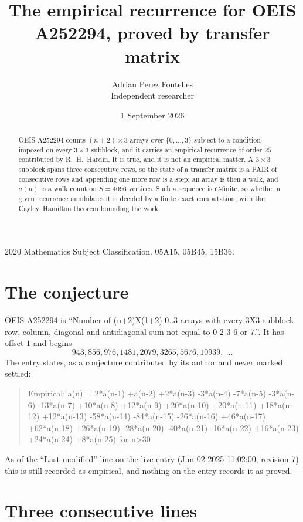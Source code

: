 \documentclass[11pt,a4paper]{article}
\title{The empirical recurrence for OEIS A252294, proved by transfer matrix}
\author{Adrian Perez Fontelles\\ \small Independent researcher}
\date{1 September 2026}
\theoremstyle{plain}
\theoremstyle{definition}
\begin{document}
\maketitle

\begin{abstract}
OEIS A252294 counts $(n+2)\times3$ arrays over $\{0,\dots,3\}$ subject to a condition imposed on
every $3\times3$ subblock, and it carries an empirical recurrence of order $25$
contributed by R.~H.~Hardin. It is true, and it is not an empirical matter. A $3\times3$
subblock spans three consecutive rows, so the state of a transfer matrix is a PAIR of
consecutive rows and appending one more row is a step; an array is then a walk, and
$a(n)$ is a walk count on $S=4096$ vertices. Such a sequence is $C$-finite, so whether a given
recurrence annihilates it is decided by a finite exact computation, with the Cayley--Hamilton
theorem bounding the work.
\end{abstract}

\noindent\small 2020 Mathematics Subject Classification. 05A15, 05B45, 15B36.\normalsize

\section{The conjecture}

OEIS A252294 is ``Number of (n+2)X(1+2) 0..3 arrays with every 3X3 subblock row, column, diagonal and antidiagonal sum not equal to 0 2 3 6 or 7.''. It has offset $1$ and begins
\[
943, 856, 976, 1481, 2079, 3265, 5676, 10939,\ \dots
\]
The entry states, as a conjecture contributed by its author and never marked settled:
\begin{quote}
Empirical: a(n) = 2*a(n-1) +a(n-2) +2*a(n-3) -3*a(n-4) -7*a(n-5) -3*a(n-6) -13*a(n-7) +10*a(n-8) +12*a(n-9) +20*a(n-10) +20*a(n-11) +18*a(n-12) +12*a(n-13) -58*a(n-14) -84*a(n-15) -26*a(n-16) +46*a(n-17) +62*a(n-18) +26*a(n-19) -28*a(n-20) -40*a(n-21) -16*a(n-22) +16*a(n-23) +24*a(n-24) +8*a(n-25) for n>30
\end{quote}
As of the ``Last modified'' line on the live entry (Jun 02 2025 11:02:00, revision 7) this is still
recorded as empirical, and nothing on the entry records it as proved.

\section{Three consecutive lines}
\end{document}
